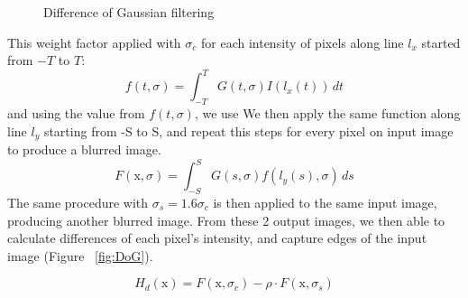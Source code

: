 \begin{figure}[H]
	\centering
	\caption{Difference of Gaussian filtering}\label{fig:image}
\end{figure}

This weight factor applied with $\sigma_{c}$ for each intensity of pixels along line $l_{x}$ started from $-T$ to $T$:
\begin{equation}
	f(t, \sigma)=\int_{-T}^{T}G(t, \sigma)I(l_{x}(t))\,dt
\end{equation}
and using the value from $f(t, \sigma)$, we use 
We then apply the same function along line $l_{y}$ starting from -S to S, and repeat this steps for every pixel on input image to produce a blurred image.
\begin{equation}
	F(\mbox{x}, \sigma)=
		\int_{-S}^{S}G(s, \sigma)f(l_{y}(s), \sigma)\,ds
\end{equation}
The same procedure with $\sigma_{s} = 1.6\sigma_{c}$ is then applied to the same input image, producing another blurred image.
From these 2 output images, we then able to calculate differences of each pixel's intensity, and capture edges of the input image (Figure ~\ref{fig:DoG}).

\begin{equation}
	H_{d}(\mbox{x}) = F(\mbox{x},\sigma_{c}) - \rho\cdot F(\mbox{x},\sigma_{s})
\end{equation}

